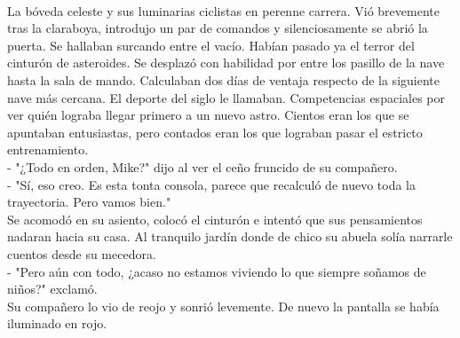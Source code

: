 \\[0.1cm]

La bóveda celeste y sus luminarias ciclistas en perenne carrera. Vió brevemente tras la claraboya, introdujo un par de comandos y silenciosamente se abrió la puerta. Se hallaban surcando entre el vacío. Habían pasado ya el terror del cinturón de asteroides. Se desplazó con habilidad por entre los pasillo de la nave hasta la sala de mando. Calculaban dos días de ventaja respecto de la siguiente nave más cercana. El deporte del siglo le llamaban. Competencias espaciales por ver quién lograba llegar primero a un nuevo astro. Cientos eran los que se apuntaban entusiastas, pero contados eran los que lograban pasar el estricto entrenamiento.\\
- "¿Todo en orden, Mike?" dijo al ver el ceño fruncido de su compañero.\\
- "Sí, eso creo. Es esta tonta consola, parece que recalculó de nuevo toda la trayectoria. Pero vamos bien."\\
Se acomodó en su asiento, colocó el cinturón e intentó que sus pensamientos nadaran hacia su casa. Al tranquilo jardín donde de chico su abuela solía narrarle cuentos desde su mecedora.\\
- "Pero aún con todo, ¿acaso no estamos viviendo lo que siempre soñamos de niños?" exclamó.\\
Su compañero lo vio de reojo y sonrió levemente. De nuevo la pantalla se había iluminado en rojo.\\[0.5cm]